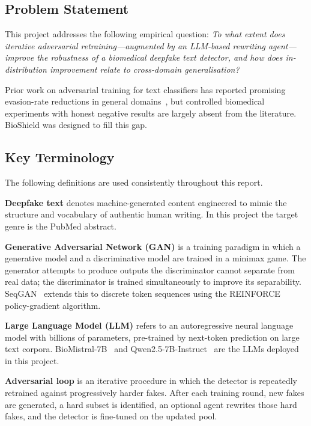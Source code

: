 \documentclass[12pt,a4paper]{article}
\begin{document}
\subsection{Problem Statement}

This project addresses the following empirical question: \emph{To what
extent does iterative adversarial retraining—augmented by an LLM-based
rewriting agent—improve the robustness of a biomedical deepfake text
detector, and how does in-distribution improvement relate to cross-domain
generalisation?}

Prior work on adversarial training for text classifiers has reported
promising evasion-rate reductions in general domains~\cite{zellers2019defending},
but controlled biomedical experiments with honest negative results are
largely absent from the literature. BioShield was designed to fill this gap.

\subsection{Key Terminology}

The following definitions are used consistently throughout this report.

\textbf{Deepfake text} denotes machine-generated content engineered to
mimic the structure and vocabulary of authentic human writing. In this
project the target genre is the PubMed abstract.

\textbf{Generative Adversarial Network (GAN)} is a training paradigm in
which a generative model and a discriminative model are trained in a
minimax game. The generator attempts to produce outputs the discriminator
cannot separate from real data; the discriminator is trained simultaneously
to improve its separability. SeqGAN~\cite{yu2017seqgan} extends this to
discrete token sequences using the REINFORCE policy-gradient algorithm.

\textbf{Large Language Model (LLM)} refers to an autoregressive neural
language model with billions of parameters, pre-trained by next-token
prediction on large text corpora. BioMistral-7B~\cite{labrak2024biomistral}
and Qwen2.5-7B-Instruct~\cite{qwen2024technical} are the LLMs deployed in
this project.

\textbf{Adversarial loop} is an iterative procedure in which the detector
is repeatedly retrained against progressively harder fakes. After each
training round, new fakes are generated, a hard subset is identified, an
optional agent rewrites those hard fakes, and the detector is fine-tuned
on the updated pool.
\end{document}
